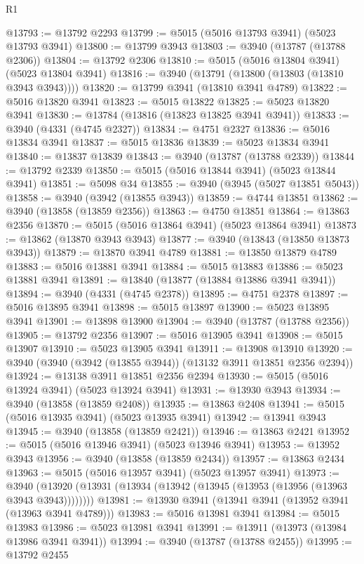 \begin{lexlean}{R1}
\begin{coremodule}
@13793 := @13792 @2293
@13799 := @5015 (@5016 @13793 @3941) (@5023 @13793 @3941)
@13800 := @13799 @3943
@13803 := @3940 (@13787 (@13788 @2306))
@13804 := @13792 @2306
@13810 := @5015 (@5016 @13804 @3941) (@5023 @13804 @3941)
@13816 := @3940 (@13791 (@13800 (@13803 (@13810 @3943 @3943))))
@13820 := @13799 @3941 (@13810 @3941 @4789)
@13822 := @5016 @13820 @3941
@13823 := @5015 @13822
@13825 := @5023 @13820 @3941
@13830 := @13784 (@13816 (@13823 @13825 @3941 @3941))
@13833 := @3940 (@4331 (@4745 @2327))
@13834 := @4751 @2327
@13836 := @5016 @13834 @3941
@13837 := @5015 @13836
@13839 := @5023 @13834 @3941
@13840 := @13837 @13839
@13843 := @3940 (@13787 (@13788 @2339))
@13844 := @13792 @2339
@13850 := @5015 (@5016 @13844 @3941) (@5023 @13844 @3941)
@13851 := @5098 @34
@13855 := @3940 (@3945 (@5027 @13851 @5043))
@13858 := @3940 (@3942 (@13855 @3943))
@13859 := @4744 @13851
@13862 := @3940 (@13858 (@13859 @2356))
@13863 := @4750 @13851
@13864 := @13863 @2356
@13870 := @5015 (@5016 @13864 @3941) (@5023 @13864 @3941)
@13873 := @13862 (@13870 @3943 @3943)
@13877 := @3940 (@13843 (@13850 @13873 @3943))
@13879 := @13870 @3941 @4789
@13881 := @13850 @13879 @4789
@13883 := @5016 @13881 @3941
@13884 := @5015 @13883
@13886 := @5023 @13881 @3941
@13891 := @13840 (@13877 (@13884 @13886 @3941 @3941))
@13894 := @3940 (@4331 (@4745 @2378))
@13895 := @4751 @2378
@13897 := @5016 @13895 @3941
@13898 := @5015 @13897
@13900 := @5023 @13895 @3941
@13901 := @13898 @13900
@13904 := @3940 (@13787 (@13788 @2356))
@13905 := @13792 @2356
@13907 := @5016 @13905 @3941
@13908 := @5015 @13907
@13910 := @5023 @13905 @3941
@13911 := @13908 @13910
@13920 := @3940 (@3940 (@3942 (@13855 @3944)) (@13132 @3911 @13851 @2356 @2394))
@13924 := @13138 @3911 @13851 @2356 @2394
@13930 := @5015 (@5016 @13924 @3941) (@5023 @13924 @3941)
@13931 := @13930 @3943
@13934 := @3940 (@13858 (@13859 @2408))
@13935 := @13863 @2408
@13941 := @5015 (@5016 @13935 @3941) (@5023 @13935 @3941)
@13942 := @13941 @3943
@13945 := @3940 (@13858 (@13859 @2421))
@13946 := @13863 @2421
@13952 := @5015 (@5016 @13946 @3941) (@5023 @13946 @3941)
@13953 := @13952 @3943
@13956 := @3940 (@13858 (@13859 @2434))
@13957 := @13863 @2434
@13963 := @5015 (@5016 @13957 @3941) (@5023 @13957 @3941)
@13973 := @3940 (@13920 (@13931 (@13934 (@13942 (@13945 (@13953 (@13956 (@13963 @3943 @3943))))))))
@13981 := @13930 @3941 (@13941 @3941 (@13952 @3941 (@13963 @3941 @4789)))
@13983 := @5016 @13981 @3941
@13984 := @5015 @13983
@13986 := @5023 @13981 @3941
@13991 := @13911 (@13973 (@13984 @13986 @3941 @3941))
@13994 := @3940 (@13787 (@13788 @2455))
@13995 := @13792 @2455

\end{coremodule}
\end{lexlean}
